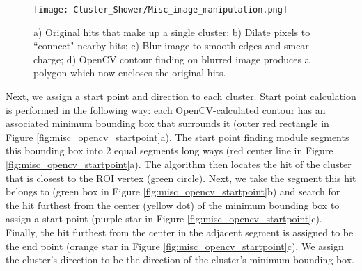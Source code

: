 \begin{figure}[H]
\centering
\texttt{[image: Cluster\_Shower/Misc\_image\_manipulation.png]}
\caption{ a) Original hits that make up a single cluster; b) Dilate pixels to ``connect" nearby hits; c) Blur image to smooth edges and smear charge; d) OpenCV contour finding on blurred image produces a polygon which now encloses the original hits.}
\label{fig:sbc}
\end{figure}




\par Next, we assign a start point and direction to each cluster. Start point calculation is performed in the following way: each OpenCV-calculated contour has an associated minimum bounding box \cite{bib:minAreaRect} that surrounds it (outer red rectangle in Figure \ref{fig:misc_opencv_startpoint}a). The start point finding module segments this bounding box into 2 equal segments long ways (red center line in Figure \ref{fig:misc_opencv_startpoint}a). The algorithm then locates the hit of the cluster that is closest to the ROI vertex (green circle).  Next, we take the segment this hit belongs to (green box in Figure \ref{fig:misc_opencv_startpoint}b) and search for the hit furthest from the center (yellow dot) of the minimum bounding box to assign a start point (purple star in Figure \ref{fig:misc_opencv_startpoint}c). Finally, the hit furthest from the center in the adjacent segment is assigned to be the end point (orange star in Figure \ref{fig:misc_opencv_startpoint}c). We assign the cluster's direction to be the direction of the cluster's minimum bounding box.

